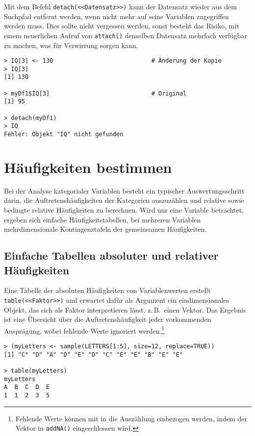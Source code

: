 Mit dem Befehl \lstinline!detach(<<Datensatz>>)! kann der Datensatz wieder aus dem Suchpfad entfernt werden, wenn nicht mehr auf seine Variablen zugegriffen werden muss. Dies sollte nicht vergessen werden, sonst besteht das Risiko, mit einem neuerlichen Aufruf von \lstinline!attach()! denselben Datensatz mehrfach verfügbar zu machen, was für Verwirrung sorgen kann.
\begin{lstlisting}
> IQ[3] <- 130                            # Änderung der Kopie
> IQ[3]
[1] 130

> myDf1$IQ[3]                             # Original
[1] 95

> detach(myDf1)
> IQ
Fehler: Objekt "IQ" nicht gefunden
\end{lstlisting}

\section{Häufigkeiten bestimmen}
\label{sec:table}

Bei der Analyse kategorialer Variablen besteht ein typischer Auswertungsschritt darin, die Auftretenshäufigkeiten der Kategorien auszuzählen und relative sowie bedingte relative Häufigkeiten zu berechnen. Wird nur eine Variable betrachtet, ergeben sich einfache Häufigkeitstabellen, bei mehreren Variablen mehrdimensionale Kontingenztafeln der gemeinsamen Häufigkeiten.

\subsection{Einfache Tabellen absoluter und relativer Häufigkeiten}

Eine Tabelle der absoluten Häufigkeiten von Variablenwerten erstellt \lstinline!table(<<Faktor>>)! und erwartet dafür als Argument ein eindimensionales Objekt, das sich als Faktor interpretieren lässt, z.\,B.\ einen Vektor. Das Ergebnis ist eine Übersicht über die Auftretenshäufigkeit jeder vorkommenden Ausprägung, wobei fehlende Werte ignoriert werden.\footnote{Fehlende Werte können mit in die Auszählung einbezogen werden, indem der Vektor in \lstinline!addNA()! eingeschlossen wird.}
\begin{lstlisting}
> (myLetters <- sample(LETTERS[1:5], size=12, replace=TRUE))
[1] "C" "D" "A" "D" "E" "D" "C" "E" "E" "B" "E" "E"

> table(myLetters)
myLetters
A  B  C  D  E
1  1  2  3  5
\end{lstlisting}

